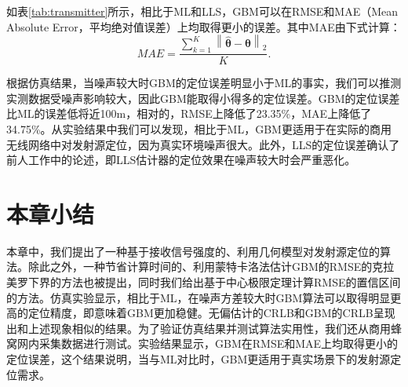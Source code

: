 如表\ref{tab:transmitter}所示，相比于ML和LLS，GBM可以在RMSE和MAE（Mean Absolute Error，平均绝对值误差）上均取得更小的误差。其中MAE由下式计算：
\begin{equation}
MAE = \frac{\sum\limits_{k=1}^K{\left\| \widehat{\bm{\theta}} - \bm{\theta} \right\|}_2}{K}.
\end{equation}

根据仿真结果，当噪声较大时GBM的定位误差明显小于ML的事实，我们可以推测实测数据受噪声影响较大，因此GBM能取得小得多的定位误差。GBM的定位误差比ML的误差低将近100m，相对的，RMSE上降低了23.35\%，MAE上降低了34.75\%。从实验结果中我们可以发现，相比于ML，GBM更适用于在实际的商用无线网络中对发射源定位，因为真实环境噪声很大。此外，LLS的定位误差确认了前人工作中的论述，即LLS估计器的定位效果在噪声较大时会严重恶化。

\section{本章小结}

本章中，我们提出了一种基于接收信号强度的、利用几何模型对发射源定位的算法。除此之外，一种节省计算时间的、利用蒙特卡洛法估计GBM的RMSE的克拉美罗下界的方法也被提出，同时我们给出基于中心极限定理计算RMSE的置信区间的方法。仿真实验显示，相比于ML，在噪声方差较大时GBM算法可以取得明显更高的定位精度，即意味着GBM更加稳健。无偏估计的CRLB和GBM的CRLB呈现出和上述现象相似的结果。为了验证仿真结果并测试算法实用性，我们还从商用蜂窝网内采集数据进行测试。实验结果显示，GBM在RMSE和MAE上均取得更小的定位误差，这个结果说明，当与ML对比时，GBM更适用于真实场景下的发射源定位需求。






